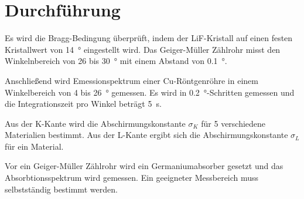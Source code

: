 \section{Durchführung}
\label{sec:Durchführung}

Es wird die Bragg-Bedingung überprüft, indem der LiF-Kristall auf einen festen Kristallwert von \SI{14}{\degree} eingestellt wird. Das Geiger-Müller Zählrohr misst den Winkelnbereich von \num{26} bis \SI{30}{\degree} mit einem Abstand von \SI{0.1}{\degree}.

Anschließend wird Emessionspektrum einer Cu-Röntgenröhre in einem Winkelbereich von \num{4} bis \SI{26}{\degree} gemessen. Es wird in \SI{0.2}{\degree}-Schritten gemessen und die Integrationszeit pro Winkel beträgt \SI{5}{\second}. 

Aus der K-Kante wird die Abschirmungskonstante $\sigma_K$ für 5 verschiedene Materialien bestimmt. Aus der L-Kante ergibt sich die Abschirmungskonstante $\sigma_L$ für ein Material. 

Vor ein Geiger-Müller Zählrohr wird ein Germaniumabsorber gesetzt und das Absorbtionsspektrum wird gemessen. Ein geeigneter Messbereich muss selbstständig bestimmt werden. 


